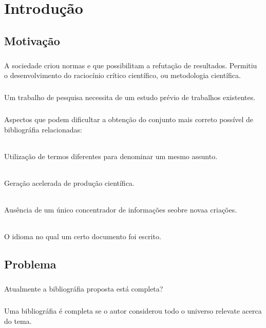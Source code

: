 \chapter{Introdução}

\section{Motivação}

\paragraph{}
A sociedade criou normas e  que possibilitam a refutação de resultados. Permitiu o desenvolvimento do raciocínio crítico científico, ou  metodologia científica.

\paragraph{}
Um trabalho de pesquisa necessita de um estudo prévio de trabalhos existentes. 

\paragraph{}
Aspectos que podem dificultar a obtenção do conjunto mais correto possível de bibliográfia relacionadas: 

\subparagraph{}
Utilização de termos diferentes para denominar um mesmo assunto.

\subparagraph{}
Geração acelerada de produção científica.

\subparagraph{}
Ausência de um único concentrador de informações seobre novaa criações.

\subparagraph{}
O idioma no qual um certo documento foi escrito.

\section{Problema}

\paragraph{}
Atualmente  a bibliográfia proposta está completa?

\paragraph{}
Uma bibliográfia é completa se o autor considerou todo o universo relevate acerca do tema. 

